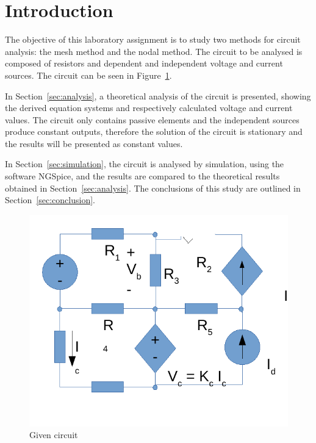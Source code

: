 \section{Introduction}
\label{sec:introduction}

\par The objective of this laboratory assignment is to study two methods for circuit analysis: the mesh method and the nodal method. The circuit to be analysed is composed of resistors and dependent and independent voltage and current sources. The circuit can be seen in Figure~\ref{fig:circuit}. 

\par In Section~\ref{sec:analysis}, a theoretical analysis of the circuit is presented, showing the derived equation systems and respectively calculated voltage and current values. The circuit only contains passive elements and the independent sources produce constant outputs, therefore the solution of the circuit is stationary and the results will be presented as constant values.
\par In Section~\ref{sec:simulation}, the circuit is analysed by
simulation, using the software NGSpice, and the results are compared to the theoretical results obtained in
Section~\ref{sec:analysis}. The conclusions of this study are outlined in
Section~\ref{sec:conclusion}.

\begin{figure}[H]
\centering
\includegraphics[width=10 cm]{rc.pdf}
\caption{Given circuit}
\label{fig:circuit}
\end{figure}
